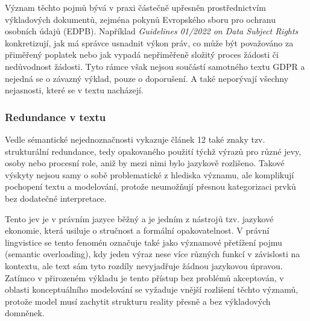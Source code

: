 \noindent Význam těchto pojmů bývá v praxi částečně upřesněn prostřednictvím výkladových dokumentů, zejména pokynů Evropského sboru pro ochranu osobních údajů (EDPB). Například \textit{Guidelines 01/2022 on Data Subject Rights} konkretizují, jak má správce usnadnit výkon práv, co může být považováno za přiměřený poplatek nebo jak vypadá nepřiměřeně složitý proces žádosti či nedůvodnost žádosti. Tyto rámce však nejsou součástí samotného textu GDPR a nejedná se o závazný výklad, pouze o doporušení. A také neporývají všechny nejasnosti, které se v textu nacházejí.



\subsubsection{Redundance v textu}
\label{sec:redundance}
Vedle sémantické nejednoznačnosti vykazuje článek 12 také znaky tzv. strukturální redundance, tedy opakovaného použití týchž výrazů pro různé jevy, osoby nebo procesní role, aniž by mezi nimi bylo jazykově rozlišeno. Takové výskyty nejsou samy o sobě problematické z hlediska významu, ale komplikují pochopení textu a modelování, protože neumožňují přesnou kategorizaci prvků bez dodatečné interpretace.

Tento jev je v právním jazyce běžný a je jedním z nástrojů tzv. jazykové ekonomie, která usiluje o stručnost a formální opakovatelnost. V právní lingvistice se tento fenomén označuje také jako významové přetížení pojmu (semantic overloading), kdy jeden výraz nese více různých funkcí v závislosti na kontextu, ale text sám tyto rozdíly nevyjadřuje žádnou jazykovou úpravou. Zatímco v přirozeném výkladu je tento přístup bez problémů akceptován, v oblasti konceptuálního modelování se vyžaduje vnější rozlišení těchto významů, protože model musí zachytit strukturu reality přesně a bez výkladových domněnek.

